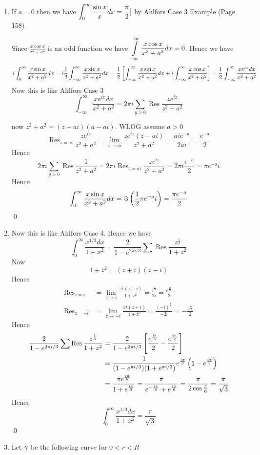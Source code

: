 \documentclass[a4paper, 11pt]{article}
\newcommand{\Res}{\operatorname{Res}}
\begin{document}
{\begin{enumerate}[label=(\alph*)]
\item If $a=0$ then we have $ \displaystyle{\int_0^{\infty}\frac{\sin x}{x}dx}=\frac{\pi}{2}]$ by Ahlfors Case 3 Example (Page 158)

Since $\frac{x\cos  x}{x^2+a^2}$ is an odd function we have $\displaystyle{\int\limits_{-\infty}^{\infty}\frac{x\cos  x}{x^2+a^2}dx=0}$. Hence we have 
$$i\int_0^{\infty}\frac{x\sin x}{x^2+a^2}dx=i\frac12\int_{-\infty}^{\infty}\frac{x\sin x}{x^2+a^2}dx=\frac12\left[ \int_{-\infty}^{\infty}\frac{x\sin x}{x^2+a^2}dx +i\int_{-\infty}^{\infty}\frac{x\cos x}{x^2+a^2}\right]=\frac12\int_{-\infty}^{\infty}\frac{xe^{ix}dx}{x^2+a^2}$$Now this is like Ahlfors Case 3
$$\int_{-\infty}^{\infty}\frac{xe^{ix}dx}{x^2+a^2}=2\pi i\sum\limits_{y>0} \Res \frac{ze^{iz}}{z^2+a^2}$$

now $z^2+a^2=(z+ai)(a-ai)$. WLOG assume $a>0$ $$\Res_{z=ai}\frac{ze^{iz}}{z^2+a^2}=\lim\limits_{z\to ai} \frac{ze^{iz}(z-ai)}{z^2+a^2}=\frac{aie^{-a}}{2ai}=\frac{e^{-a}}2$$ Hence $$2\pi i\sum\limits_{y>0}\Res \frac{1}{z^2+a^2}=2\pi i\Res_{z=ai}\frac{ze^{iz}}{z^2+a^2}=2\pi i \frac{e^{-a}}{2}=\pi e^{-a}i$$Hence  $$\int_0^{\infty}\frac{x\sin x}{x^2+a^2}dx=\Im \left(\frac12\pi e^{-a}i\right)=\frac{\pi e^{-a}}{2}$$\qed

\item Now this is like Ahlfors Case 4. Hence we  have $$\int_0^\infty\frac{x^{1/3}dx}{1+x^2}= \frac{2}{1-e^{2\pi i/3}} \sum \Res \frac{z^{\frac13}}{1+z^2}$$ Now $$1+z^2=(z+i)(z-i)$$ Hence \begin{align*}
	\Res_{z=i}&=\lim\limits_{z\to i}\frac{z^{\frac13}(z-i)}{1+z^2}=\frac{i^{\frac13}}{2i}=\frac{e^{\frac{i\pi}{6}}}2\\
	\Res_{z=-i}&=\lim\limits_{z\to -i}\frac{z^{\frac13}(z+i)}{1+z^2}=\frac{(-i)^{\frac13}}{-2i}=-\frac{e^{\frac{i\pi}{2}}}2
\end{align*}Hence \begin{align*}
\frac{2}{1-e^{2\pi i/3}} \sum \Res \frac{z^{\frac13}}{1+z^2} & = \frac{2}{1-e^{2\pi i/3}}\lt[ \frac{e^{\frac{i\pi}{6}}}2- \frac{e^{\frac{i\pi}{2}}}2\rt]\\
& = \frac1{(1-e^{\pi i/3})({1+e^{\pi i/3}})}e^{\frac{i\pi}6}\lt( 1-e^{\frac{i\pi}3} \rt)\\
& = \frac{\pi e^{\frac{i\pi}6}}{1+e^{\frac{i\pi}3}}=\frac{\pi}{ e^{-\frac{i\pi}6}+e^{\frac{i\pi}6}}=\frac{\pi}{2\cos \frac{\pi}6}=\frac{\pi}{\sqrt{3}}
\end{align*}
Hence $$\int_0^\infty\frac{x^{1/3}dx}{1+x^2}=\frac{\pi}{\sqrt{3}}$$\qed
\pagebreak

\item Let $\gamma$ be the following curve for $0<r<R$


\end{enumerate}}
\end{document}
